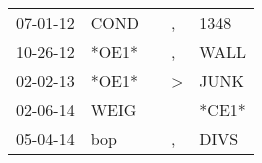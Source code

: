 \begin{supertabular}{p{0.07\textwidth}p{0.06\textwidth}p{0.02\textwidth}p{0.02\textwidth}p{0.06\textwidth}}
 07-01-12\textsuperscript{} &  COND\textsuperscript{} &   &             , &  1348\textsuperscript{} \\
 10-26-12\textsuperscript{} &                   *OE1* &   &             , &  WALL\textsuperscript{} \\
 02-02-13\textsuperscript{} &                   *OE1* &   &  \textgreater &  JUNK\textsuperscript{} \\
 02-06-14\textsuperscript{} &  WEIG\textsuperscript{} &   &               &                   *CE1* \\
 05-04-14\textsuperscript{} &   bop\textsuperscript{} &   &             , &  DIVS\textsuperscript{} \\
\end{supertabular}
